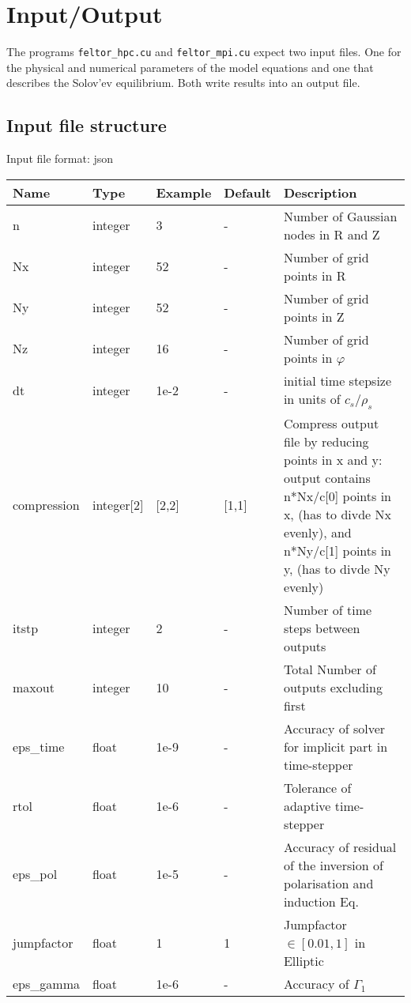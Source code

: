 \section{Input/Output}
The programs \texttt{feltor\_hpc.cu} and \texttt{feltor\_mpi.cu}
expect two input files. One for the physical and numerical parameters
of the model equations and one that describes the Solov'ev equilibrium.
Both write results into an output file.

\subsection{Input file structure}
Input file format: json

\begin{longtable}{llll>{\RaggedRight}p{6cm}}
\toprule
\rowcolor{gray!50}\textbf{Name} &  \textbf{Type} & \textbf{Example} & \textbf{Default} & \textbf{Description}  \\ \midrule
n      & integer & 3 & - &Number of Gaussian nodes in R and Z \\
Nx     & integer &52& - &Number of grid points in R \\
Ny     & integer &52& - &Number of grid points in Z \\
Nz     & integer &16& - &Number of grid points in $\varphi$ \\
dt     & integer &1e-2& - &initial time stepsize in units of $c_s/\rho_s$ \\
compression & integer[2] & [2,2] & [1,1] & Compress output file by reducing points in x and y: output contains n*Nx/c[0] points in x,
    (has to divde Nx evenly), and n*Ny/c[1] points in y,
    (has to divde Ny evenly)\\
itstp       & integer & 2  & - & Number of time steps between outputs \\
maxout      & integer & 10 & - & Total Number of outputs excluding first \\
eps\_time   & float & 1e-9  & - & Accuracy of solver for implicit part in time-stepper \\
rtol  & float &1e-6   & - &Tolerance of adaptive time-stepper \\
eps\_pol    & float & 1e-5  & - &  Accuracy of residual of the inversion of polarisation and induction Eq. \\
jumpfactor  & float & 1 & 1 & Jumpfactor $\in \left[0.01,1\right]$ in Elliptic\\
eps\_gamma  & float & 1e-6  & - & Accuracy of $\Gamma_1$  \\

\end{longtable}
